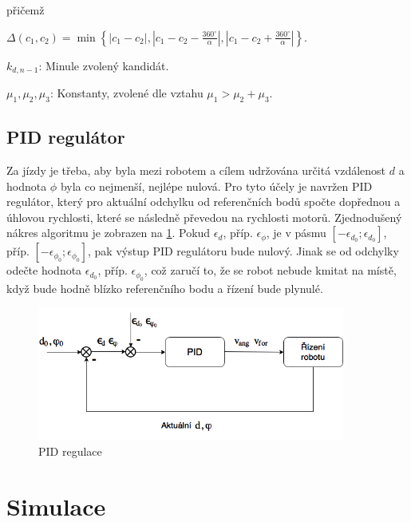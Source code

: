 \documentclass[twoside]{ctuthesis}
\theoremstyle{plain}
\theoremstyle{definition}
\theoremstyle{note}
\begin{document}
přičemž

$\Delta(c_1, c_2) = \min\left\{|c_1 - c_2|, |c_1 - c_2 - \frac{360^{\circ}}{\alpha}|, |c_1 - c_2 + \frac{360^{\circ}}{\alpha}|\right\}$.

$k_{d, n-1}$: Minule zvolený kandidát.

$\mu_1, \mu_2, \mu_3$: Konstanty, zvolené dle vztahu $\mu_1 > \mu_2 + \mu_3$.

\section{PID regulátor}

 
Za jízdy je třeba, aby byla mezi robotem a cílem udržována určitá vzdálenost $d$ a hodnota $\phi$ byla co nejmenší, nejlépe nulová. Pro tyto účely je navržen PID regulátor, který pro aktuální odchylku od referenčních bodů spočte dopřednou a úhlovou rychlosti, které se následně převedou na rychlosti motorů. Zjednodušený nákres algoritmu je zobrazen na \ref{pid}.  Pokud $\epsilon_d$, příp. $\epsilon_\phi$, je v pásmu $\left[-\epsilon_{d_0}; \epsilon_{d_0}\right]$, příp. $\left[-\epsilon_{\phi_0}; \epsilon_{\phi_0}\right]$, pak výstup PID regulátoru bude nulový. Jinak se od odchylky odečte hodnota $\epsilon_{d_0}$, příp. $\epsilon_{\phi_0}$, což zaručí to, že se robot nebude kmitat na místě, když bude hodně blízko referenčního bodu a řízení bude plynulé.

\begin{figure}
	\caption{PID regulace}
	
	\label{pid}
	\includegraphics[width=0.9\textwidth, height = 0.4\textwidth]{images/3/pid.png}
\end{figure}


\chapter{Simulace}
\end{document}
